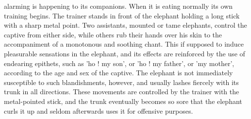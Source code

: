 \documentclass[kindlepaper]{BHCexam4kindle}
\begin{document}
alarming is happening to its companions. When it is eating normally its own training begins. The trainer stands
in front of the elephant holding a long stick with a sharp metal point. Two assistants, mounted or tame
elephants, control the captive from either side, while others rub their hands over his skin to the accompaniment
of a monotonous and soothing chant. This if supposed to induce pleasurable sensations in the elephant, and its
effects are reinforced by the use of endearing epithets, such as 'ho ! my son', or 'ho ! my father', or 'my mother',
according to the age and sex of the captive. The elephant is not immediately susceptible to such blandishments,
however, and usually lashes fiercely with its trunk in all directions. These movements are controlled by the
trainer with the metal-pointed stick, and the trunk eventually becomes so sore that the elephant curls it up and
seldom afterwards uses it for offensive purposes.
\clearpage
\end{document}
